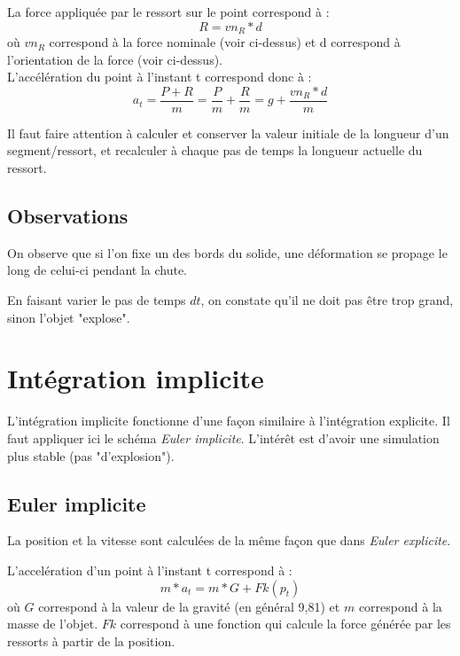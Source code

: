 \documentclass[a4paper]{article}
\begin{document}
La force appliquée par le ressort sur le point correspond à :
\begin{equation}
  R = vn_R * d
\end{equation}
où $vn_R$ correspond à la force nominale (voir ci-dessus) et d correspond à l'orientation de la force (voir ci-dessus).\\

L'accélération du point à l'instant t correspond donc à :
\begin{equation}
  a_t = \frac{P + R}{m} = \frac{P}{m} + \frac{R}{m} = g + \frac{vn_R * d}{m}
\end{equation}

Il faut faire attention à calculer et conserver la valeur initiale de la longueur d'un segment/ressort, et recalculer à chaque pas de temps la longueur actuelle du ressort.\\

\subsection{Observations}

On observe que si l'on fixe un des bords du solide, une déformation se propage le long de celui-ci pendant la chute.

En faisant varier le pas de temps $dt$, on constate qu'il ne doit pas être trop grand, sinon l'objet "explose".

\section{Intégration implicite}

L'intégration implicite fonctionne d'une façon similaire à l'intégration explicite. Il faut appliquer ici le schéma {\em Euler implicite}. L'intérêt est d'avoir une simulation plus stable (pas "d'explosion").\\

\subsection{Euler implicite}

La position et la vitesse sont calculées de la même façon que dans {\em Euler explicite}.

L'accelération d'un point à l'instant t correspond à :
\begin{equation}
  m * a_t = m * G + Fk(p_t)
\end{equation}
où $G$ correspond à la valeur de la gravité (en général 9,81) et $m$ correspond à la masse de l'objet. $Fk$ correspond à une fonction qui calcule la force générée par les ressorts à partir de la position.
\end{document}
